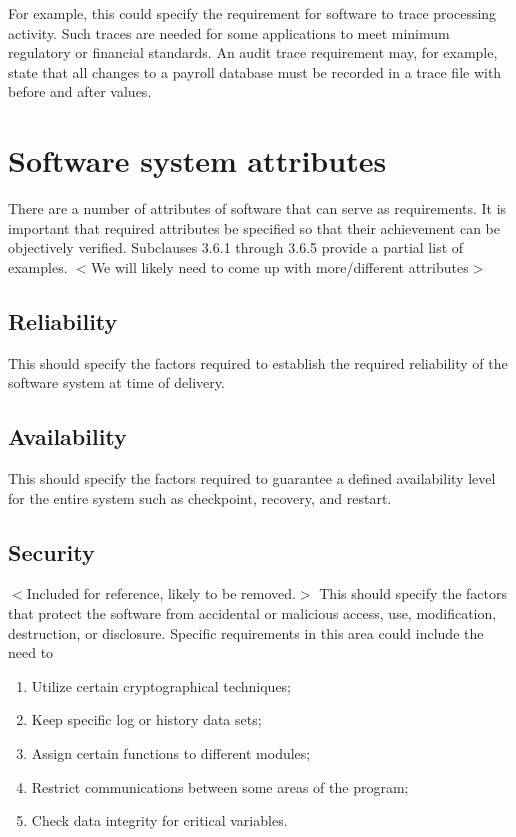 \documentclass{scrreprt}
\begin{document}
For example, this could specify the requirement for software to trace processing
activity. Such traces are needed for some applications to meet minimum
regulatory or financial standards. An audit trace requirement may, for example,
state that all changes to a payroll database must be recorded in a trace file
with before and after values.

\section{Software system attributes}
There are a number of attributes of software that can serve as requirements. It
is important that required attributes be specified so that their achievement can
be objectively verified. Subclauses 3.6.1 through 3.6.5 provide a partial list
of examples.
$<$We will likely need to come up with more/different attributes$>$

\subsection{Reliability}
This should specify the factors required to establish the required reliability
of the software system at time of delivery.

\subsection{Availability}
This should specify the factors required to guarantee a defined availability
level for the entire system such as checkpoint, recovery, and restart.

\subsection{Security}
$<$Included for reference, likely to be removed.$>$
This should specify the factors that protect the software from accidental or
malicious access, use, modification, destruction, or disclosure. Specific
requirements in this area could include the need to

\begin{enumerate}
	\item Utilize certain cryptographical techniques;
	\item Keep specific log or history data sets;
	\item Assign certain functions to different modules;
	\item Restrict communications between some areas of the program;
	\item Check data integrity for critical variables.
\end{enumerate}
\end{document}
